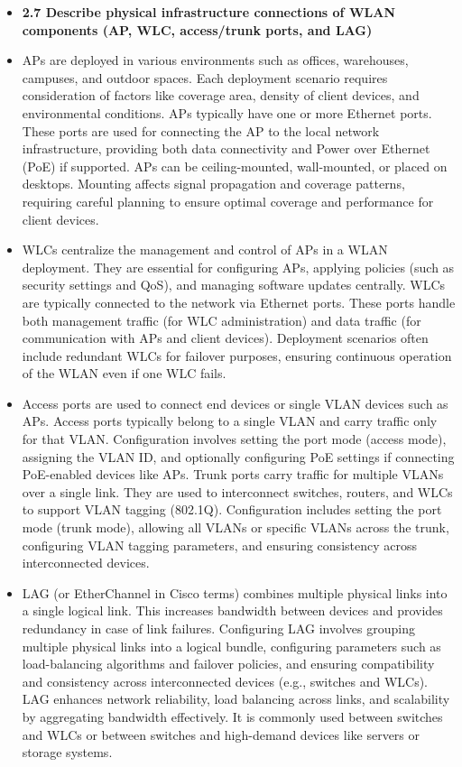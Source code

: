 \documentclass{article}
\begin{document}
\begin{itemize}
  \item \textbf{2.7 Describe physical infrastructure connections of WLAN components (AP, WLC, access/trunk ports, and LAG)}
  	\item[] APs are deployed in various environments such as offices, warehouses, campuses, and outdoor spaces. Each deployment scenario requires consideration of factors like coverage area, density of client devices, and environmental conditions. APs typically have one or more Ethernet ports. These ports are used for connecting the AP to the local network infrastructure, providing both data connectivity and Power over Ethernet (PoE) if supported. APs can be ceiling-mounted, wall-mounted, or placed on desktops. Mounting affects signal propagation and coverage patterns, requiring careful planning to ensure optimal coverage and performance for client devices.
	\item[] WLCs centralize the management and control of APs in a WLAN deployment. They are essential for configuring APs, applying policies (such as security settings and QoS), and managing software updates centrally. WLCs are typically connected to the network via Ethernet ports. These ports handle both management traffic (for WLC administration) and data traffic (for communication with APs and client devices). Deployment scenarios often include redundant WLCs for failover purposes, ensuring continuous operation of the WLAN even if one WLC fails.
	\item[] Access ports are used to connect end devices or single VLAN devices such as APs. Access ports typically belong to a single VLAN and carry traffic only for that VLAN. Configuration involves setting the port mode (access mode), assigning the VLAN ID, and optionally configuring PoE settings if connecting PoE-enabled devices like APs. Trunk ports carry traffic for multiple VLANs over a single link. They are used to interconnect switches, routers, and WLCs to support VLAN tagging (802.1Q). Configuration includes setting the port mode (trunk mode), allowing all VLANs or specific VLANs across the trunk, configuring VLAN tagging parameters, and ensuring consistency across interconnected devices.
	\item[] LAG (or EtherChannel in Cisco terms) combines multiple physical links into a single logical link. This increases bandwidth between devices and provides redundancy in case of link failures. Configuring LAG involves grouping multiple physical links into a logical bundle, configuring parameters such as load-balancing algorithms and failover policies, and ensuring compatibility and consistency across interconnected devices (e.g., switches and WLCs).  LAG enhances network reliability, load balancing across links, and scalability by aggregating bandwidth effectively. It is commonly used between switches and WLCs or between switches and high-demand devices like servers or storage systems.

\end{itemize}
\end{document}
